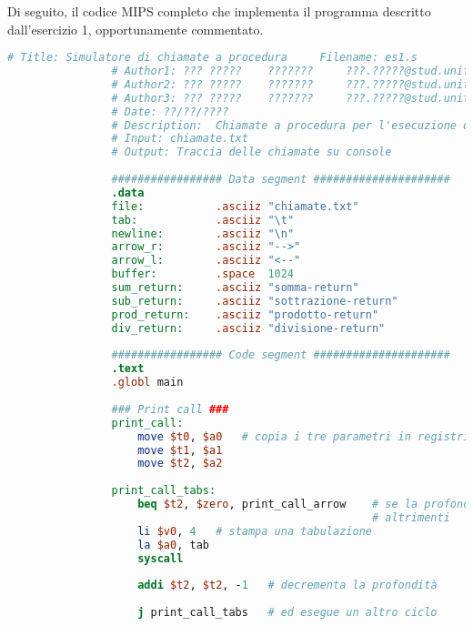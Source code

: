 		Di seguito, il codice MIPS completo che implementa il programma descritto dall'esercizio 1, opportunamente commentato.
		
        \begin{center}
           	\begin{lstlisting}[language=mips, gobble=14, stepnumber=1]
                # Title: Simulatore di chiamate a procedura     Filename: es1.s
                # Author1: ??? ?????    ???????     ???.?????@stud.unifi.it
                # Author2: ??? ?????    ???????     ???.?????@stud.unifi.it
                # Author3: ??? ?????    ???????     ???.?????@stud.unifi.it
                # Date: ??/??/????
                # Description:  Chiamate a procedura per l'esecuzione di operazioni aritmetiche
                # Input: chiamate.txt
                # Output: Traccia delle chiamate su console
                
                ################# Data segment #####################
                .data
                file:           .asciiz "chiamate.txt"
                tab:            .asciiz "\t"
                newline:        .asciiz "\n"
                arrow_r:        .asciiz "-->"
                arrow_l:        .asciiz "<--"
                buffer:         .space  1024
                sum_return:     .asciiz "somma-return"
                sub_return:     .asciiz "sottrazione-return"
                prod_return:    .asciiz "prodotto-return"
                div_return:     .asciiz "divisione-return"
                
                ################# Code segment #####################
                .text
                .globl main
                
                ### Print call ###
                print_call:
                    move $t0, $a0   # copia i tre parametri in registri temporanei
                    move $t1, $a1
                    move $t2, $a2
                    
                print_call_tabs:
                    beq $t2, $zero, print_call_arrow    # se la profondità è 0, allora procede a stampare la stringa
                                                        # altrimenti
                    li $v0, 4   # stampa una tabulazione
                    la $a0, tab
                    syscall
                    
                    addi $t2, $t2, -1   # decrementa la profondità
                    
                    j print_call_tabs   # ed esegue un altro ciclo
                    

\end{lstlisting}
\end{center}
